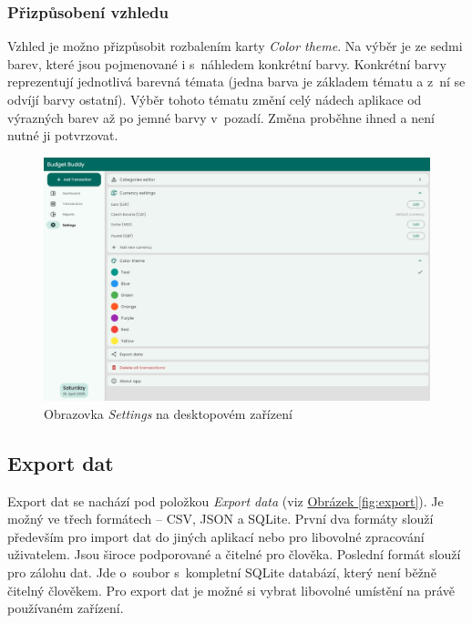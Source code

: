 \documentclass[
  biblatex,
  figures=true,
  tables=false,
  glossaries,
  index
]{kidiplom}
\begin{document}
\subsubsection{Přizpůsobení vzhledu}
Vzhled je možno přizpůsobit rozbalením karty \textit{Color theme}. Na výběr je ze sedmi barev, které jsou pojmenované i s~náhledem konkrétní barvy. Konkrétní barvy reprezentují jednotlivá barevná témata (jedna barva je základem tématu a z~ní se odvíjí barvy ostatní). Výběr tohoto tématu změní celý nádech aplikace od výrazných barev až po jemné barvy v~pozadí. Změna proběhne ihned a není nutné ji potvrzovat.

\begin{figure}
  \centering
  \includegraphics[width=\textwidth]{images/settings-large.png}
  \caption{Obrazovka \textit{Settings} na desktopovém zařízení}
  \label{fig:settings}
\end{figure}

\subsection{Export dat}
Export dat se nachází pod položkou \textit{Export data} (viz \hyperref[fig:export]{Obrázek \ref{fig:export}}). Je možný ve třech formátech -- CSV, JSON a SQLite. První dva formáty slouží především pro import dat do jiných aplikací nebo pro libovolné zpracování uživatelem. Jsou široce podporované a čitelné pro člověka. Poslední formát slouží pro zálohu dat. Jde o~soubor s~kompletní SQLite databází, který není běžně čitelný člověkem. Pro export dat je možné si vybrat libovolné umístění na právě používaném zařízení.
\end{document}
